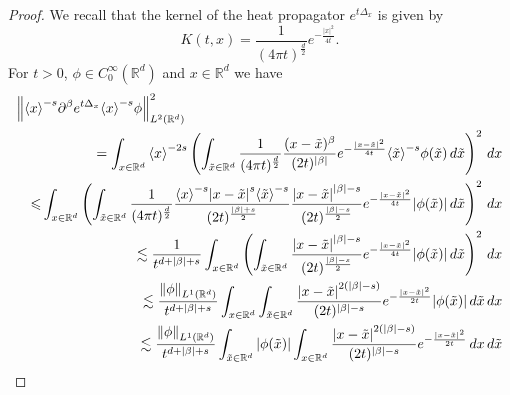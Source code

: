 \documentclass[10pt, a4paper,reqno]{amsart}
\theoremstyle{plain}
\theoremstyle{definition}
\theoremstyle{remark}
\begin{document}
\begin{proof}
We recall that the kernel of the heat propagator $e^{t{{\Delta}_x} }$ is given by
\[
K(t,x) = \frac 1 {(4\pi t)^{\frac d 2}} e^{-\frac {{\left\vert x\right\vert}^2}{4t}}.
\]
For $t > 0$, ${\phi} \in C_0^\infty({\mathbb{R}}^d)$ and $x \in {\mathbb{R}}^d$ we have 
\begin{eqnarray*}
\lefteqn{{\left\Vert {{\left< x \right>}^{-s} \partial^{\beta} e^{t{{\Delta}_x}} {\left< x \right>}^{-s} {\phi}}\right\Vert}_{L^2({\mathbb{R}}^d)}^2}\\
&& = \int_{x\in{\mathbb{R}}^d} {\left< x \right>}^{-2s} \left( \int_{\tilde x \in {\mathbb{R}}^d} \frac 1 {(4\pi t)^{\frac d 2}} \frac {(x-\tilde x)^{\beta}}{(2t)^{{\left\vert {\beta}\right\vert}}} e^{-\frac {{\left\vert {x - \tilde x}\right\vert}^2}{4t}} {\left< {\tilde x} \right>}^{-s} {\phi}(\tilde x) \, d\tilde x\right)^2 \, dx\\
&& {\leqslant} \int_{x\in{\mathbb{R}}^d} \left( \int_{\tilde x \in {\mathbb{R}}^d} \frac 1 {(4\pi t)^{\frac d 2}} \frac {{\left< x \right>}^{-s} {\left\vert {x-\tilde x}\right\vert}^{s}{\left< {\tilde x} \right>}^{-s}}{(2t)^{\frac {{\left\vert {\beta}\right\vert} + s}2}} \frac {{\left\vert {x-\tilde x}\right\vert}^{{\left\vert {\beta}\right\vert}-s}}{(2t)^{\frac {{\left\vert {\beta}\right\vert} - s}2}} e^{-\frac {{\left\vert {x - \tilde x}\right\vert}^2}{4t}}  {\left\vert {{\phi}(\tilde x)}\right\vert} \, d\tilde x\right)^2 \, dx\\
&& \lesssim  \frac 1 {t^{d + {\left\vert {\beta}\right\vert} + s}} \int_{x\in{\mathbb{R}}^d} \left( \int_{\tilde x \in {\mathbb{R}}^d}  \frac {{\left\vert {x-\tilde x}\right\vert}^{{\left\vert {\beta}\right\vert}-s}}{(2t)^{\frac {{\left\vert {\beta}\right\vert} - s}2}} e^{-\frac {{\left\vert {x - \tilde x}\right\vert}^2}{4t}}  {\left\vert {{\phi}(\tilde x)}\right\vert} \, d\tilde x\right)^2 \, dx\\
&& \lesssim  \frac {{\left\Vert {\phi}\right\Vert}_{L^1({\mathbb{R}}^d)}} {t^{d + {\left\vert {\beta}\right\vert} + s}} \int_{x\in{\mathbb{R}}^d} \int_{\tilde x \in {\mathbb{R}}^d}  \frac {{\left\vert {x-\tilde x}\right\vert}^{2({\left\vert {\beta}\right\vert}-s)}}{(2t)^{{{\left\vert {\beta}\right\vert} - s}}} e^{-\frac {{\left\vert {x - \tilde x}\right\vert}^2}{2t}}  {\left\vert {{\phi}(\tilde x)}\right\vert} \, d\tilde x \, dx\\
&& \lesssim  \frac {{\left\Vert {\phi}\right\Vert}_{L^1({\mathbb{R}}^d)}} {t^{d + {\left\vert {\beta}\right\vert} + s}} \int_{\tilde x \in {\mathbb{R}}^d}  {\left\vert {{\phi}(\tilde x)}\right\vert} \int_{x\in{\mathbb{R}}^d} \frac {{\left\vert {x-\tilde x}\right\vert}^{2({\left\vert {\beta}\right\vert}-s)}}{(2t)^{{{\left\vert {\beta}\right\vert} - s}}} e^{-\frac {{\left\vert {x - \tilde x}\right\vert}^2}{2t}}  \, dx  \, d\tilde x \\

\end{eqnarray*}
\end{proof}
\end{document}
